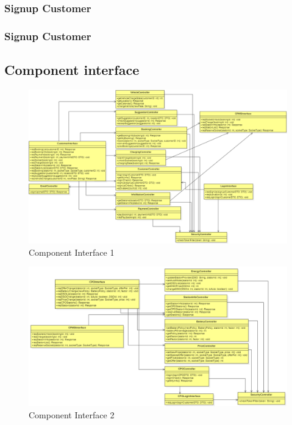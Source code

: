 \subsubsection{Signup Customer}
\subsubsection{Signup Customer}

\subsection{Component interface}


\begin{figure}[H]
    \begin{center}
        \includegraphics[width=\textwidth]{img/ComponentInterface1.PNG}
        \caption{Component Interface 1}\label{component_interface1}
    \end{center}
\end{figure}

\begin{figure}[H]
    \begin{center}
        \includegraphics[width=\textwidth]{img/ComponentInterface2.PNG}
        \caption{Component Interface 2}\label{component_interface2}
    \end{center}
\end{figure}

